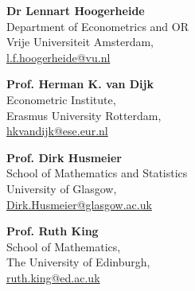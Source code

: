 \documentclass[margin,line]{resume}
\newlength\Colsep
\begin{document}
\begin{resume}
\begin{minipage}[t][6cm][t]{\dimexpr0.5\textwidth-0.5\Colsep\relax}
\textbf{Dr Lennart Hoogerheide} \\  
Department of Econometrics and OR \\  
Vrije Universiteit Amsterdam,\\ \url{l.f.hoogerheide@vu.nl}
\vspace{5mm}

\textbf{Prof. Herman K. van Dijk} \\  
Econometric Institute,\\  
Erasmus University Rotterdam,\\ \url{hkvandijk@ese.eur.nl}
\end{minipage}
\hfill
\begin{minipage}[t][6cm][t]{\dimexpr0.5\textwidth-0.5\Colsep\relax}
\textbf{Prof. Dirk Husmeier} \\    
School of  Mathematics and Statistics\\
University of Glasgow,\\ \url{Dirk.Husmeier@glasgow.ac.uk}
\vspace{5mm}

\textbf{Prof. Ruth King} \\  
School of Mathematics,\\  
The University of Edinburgh,\\ \url{ruth.king@ed.ac.uk}
\vspace{5mm}



\end{minipage}


\end{resume}
\end{document}
